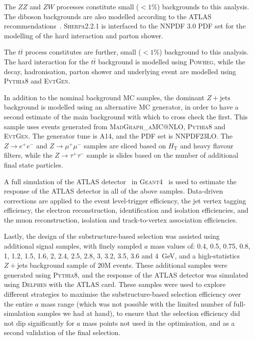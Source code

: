 \documentclass[NOTE, atlasdraft=true, texlive=2017, UKenglish]{\ATLASLATEXPATH atlasdoc}
\begin{document}
The $ZZ$ and $ZW$ processes constitute small ($<1\%$) backgrounds to this analysis. The diboson backgrounds are also modelled according to the ATLAS recommendations~\cite{ATL-PHYS-PUB-2017-005}. \textsc{Sherpa}2.2.1 is interfaced to the \textsc{NNPDF} 3.0 PDF set for the modelling of the hard interaction and parton shower.

The $t\bar t$ process constitutes are further, small ($<1\%$) background to this analysis. The hard interaction for the $t\bar t$ background is modelled using \textsc{Powheg}, while the decay, hadronisation, parton shower and underlying event are modelled using \textsc{Pythia}8 and \textsc{EvtGen}.

In addition to the nominal background MC samples, the dominant $Z+\text{jets}$ background is modelled using an alternative MC generator, in order to have a second estimate of the main background with which to cross check the first. This sample uses events generated from \textsc{MadGraph\_aMC@NLO}, \textsc{Pythia}8 and \textsc{EvtGen}. The generator tune is \textsc{A14}, and the PDF set is \textsc{NNPDF23LO}. The $Z\to e^+e^-$ and $Z\to \mu^+\mu^-$ samples are sliced based on $H_\text{T}$ and heavy flavour filters, while the $Z\to \tau^+\tau^-$ sample is slides based on the number of additional final state particles.

A full simulation of the ATLAS detector~\cite{Aad2010} in \textsc{Geant}4~\cite{AGOSTINELLI2003250} is used to estimate the response of the ATLAS detector in all of the above samples. Data-driven corrections are applied to the event level-trigger efficiency, the jet vertex tagging efficiency, the electron reconstruction, identification and isolation efficiencies, and the muon reconstruction, isolation and track-to-vertex association efficiencies.

Lastly, the design of the substructure-based selection was assisted using additional signal samples, with finely sampled $a$ mass values of: 0.4, 0.5, 0.75, 0.8, 1, 1.2, 1.5, 1.6, 2, 2.4, 2.5, 2.8, 3, 3.2, 3.5, 3.6 and 4~GeV, and a high-statistics $Z+$jets background sample of 20M events. These additional samples were generated using \textsc{Pythia}8, and the response of the ATLAS detector was simulated using \textsc{Delphes} with the ATLAS card. These samples were used to explore different strategies to maximise the substructure-based selection efficiency over the entire $a$ mass range (which was not possible with the limited number of full-simulation samples we had at hand), to ensure that the selection efficiency did not dip significantly for $a$ mass points not used in the optimisation, and as a second validation of the final selection.
\end{document}
